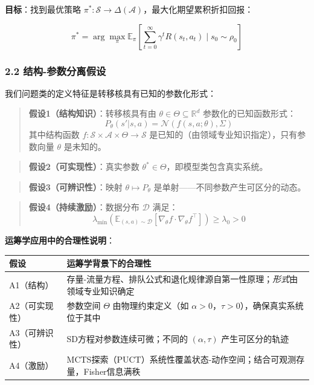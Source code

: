 \documentclass[UTF8]{ctexart}
\begin{document}
\textbf{目标}：找到最优策略
\(\pi^*: \mathcal{S} \to \Delta(\mathcal{A})\)，最大化期望累积折扣回报：

\[\pi^* = \arg\max_\pi \mathbb{E}_\pi \left[ \sum_{t=0}^{\infty} \gamma^t R(s_t, a_t) \mid s_0 \sim \rho_0 \right]\]

\hypertarget{ux7ed3ux6784-ux53c2ux6570ux5206ux79bbux5047ux8bbe}{%
\subsubsection{2.2
结构-参数分离假设}\label{ux7ed3ux6784-ux53c2ux6570ux5206ux79bbux5047ux8bbe}}

我们问题类的定义特征是转移核具有已知的参数化形式：

\begin{quote}
\textbf{假设1（结构知识）}：转移核具有由
\(\theta \in \Theta \subseteq \mathbb{R}^d\) 参数化的已知函数形式：
\[P_\theta(s'|s,a) = \mathcal{N}(f(s,a;\theta), \Sigma)\] 其中结构函数
\(f: \mathcal{S} \times \mathcal{A} \times \Theta \to \mathcal{S}\)
是已知的（由领域专业知识指定），只有参数向量 \(\theta\) 是未知的。
\end{quote}

\begin{quote}
\textbf{假设2（可实现性）}：真实参数
\(\theta^* \in \Theta\)，即模型类包含真实系统。
\end{quote}

\begin{quote}
\textbf{假设3（可辨识性）}：映射 \(\theta \mapsto P_\theta\)
是单射------不同参数产生可区分的动态。
\end{quote}

\begin{quote}
\textbf{假设4（持续激励）}：数据分布 \(\mathcal{D}\) 满足：
\[\lambda_{\min}\left(\mathbb{E}_{(s,a)\sim\mathcal{D}}\left[\nabla_\theta f \cdot \nabla_\theta f^\top\right]\right) \geq \lambda_0 > 0\]
\end{quote}

\textbf{运筹学应用中的合理性说明}：

\begin{table}[h]
\centering
\begin{tabular}{p{3cm}p{11cm}}
\toprule
\textbf{假设} & \textbf{运筹学背景下的合理性} \\
\midrule
A1（结构） & 存量-流量方程、排队公式和退化规律源自第一性原理；\emph{形式}由领域专业知识确定 \\
A2（可实现性） & 参数空间 \(\Theta\) 由物理约束定义（如 \(\alpha > 0\)，\(\tau > 0\)），确保真实系统位于其中 \\
A3（可辨识性） & SD方程对参数连续可微；不同的 \((\alpha, \tau)\) 产生可区分的轨迹 \\
A4（激励） & MCTS探索（PUCT）系统性覆盖状态-动作空间；结合可观测存量，Fisher信息满秩 \\
\bottomrule
\end{tabular}
\end{table}
\end{document}
